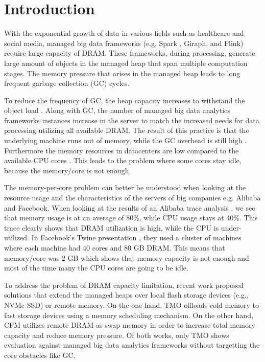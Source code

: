 \section{Introduction}
\label{sec:intro}

With the exponential growth of data in various fields such as
healthcare and social media, managed big data frameworks (e.g, Spark
\cite{Spark}, Giraph,
and Flink) require large capacity of DRAM. These frameworks, during
processing, generate large amount of objects in the managed heap that
span multiple computation stages. The memory pressure that arises in
the managed heap leads to long frequent garbage collection (GC)
cycles.

To reduce the frequency of GC, the heap capacity increases to
withstand the object load . Along with GC, the number of managed big
data analytics frameworks instances increase in the server to match
the increased needs for data processing utilizing all available DRAM.
The result of this practice is that the underlying machine runs out of
memory, while the GC overhead is still high . Furthermore the memory
resources in datacenters are low compared to the available CPU cores
.
This leads to the problem where some cores stay idle, because the
memory/core is not enough.

The memory-per-core problem can better be understood when looking at
the resource usage and the characteristics of the servers of big
companies e.g. Alibaba and Facebook. When looking at the results of an
Alibaba trace analysis \cite{Alibaba}, we see that memory usage is at
an average of 80\%, while CPU usage stays at 40\%. This trace clearly
shows that DRAM utilization is high, while the CPU is under-utilized.
In Facebook's Twine presentation \cite{Twine}, they used a cluster of
machines where each machine had 40 cores and 80 GB DRAM. This means
that memory/core was 2 GB which shows that memory capacity is not
enough and most of the time many the CPU cores are going to be idle.

To address the problem of DRAM capacity limitation, recent work
proposed solutions that extend the managed heaps over local flash
storage devices (e.g., NVMe SSD) or remote memory. On the one hand,
TMO \cite{TMO} offloads cold memory to fast storage devices using
a memory scheduling mechanism. On the other hand, CFM \cite{CFM}
utilizes remote DRAM as swap memory in order to increase total memory capacity
and reduce memory pressure. Of both works, only TMO shows
evaluation against managed big data analytics frameworks without
targetting the core obstacles like GC.


